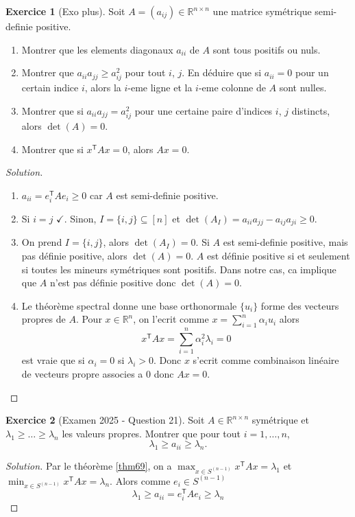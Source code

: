 \documentclass[a4paper,12pt,french]{report}
\theoremstyle{plain}
\theoremstyle{definition}
\newtheorem{exercise}{Exercice}[chapter]
\begin{document}
\begin{exercise}[Exo plus]
Soit $A=(a_{ij})\in \mathbb{R}^{n\times n}$ une matrice symétrique semi-definie positive.
\begin{enumerate}
\item Montrer que les elements diagonaux $a_{ii}$ de $A$ sont tous positifs ou nuls.
\item Montrer que $a_{ii}a_{jj}\ge a_{ij}^{2}$ pour tout $i$, $j$. En déduire que si $a_{ii}=0$ pour un certain indice $i$, alors la $i$-eme ligne et la $i$-eme colonne de $A$ sont nulles.
\item Montrer que si $a_{ii}a_{jj}=a_{ij}^{2}$ pour une certaine paire d'indices $i$, $j$ distincts, alors $\det(A)=0$.
\item Montrer que si $x^{\mathsf{T}}Ax=0$, alors $Ax=0$.
\end{enumerate}
\end{exercise}
\begin{proof}[Solution]
\begin{enumerate}
\item $a_{ii}=e_{i}^{\mathsf{T}}Ae_{i}\ge 0$ car $A$ est semi-definie positive.
\item Si $i=j$ $\checkmark$. Sinon, $I=\{ i,j \}\subseteq[n]$ et $\det(A_{I})=a_{ii}a_{jj}-a_{ij}a_{ji}\ge 0$.
\item On prend $I=\{ i,j \}$, alors $\det (A_{I})=0$. Si $A$ est semi-definie positive, mais pas définie positive, alors $\det(A)=0$. $A$ est définie positive si et seulement si toutes les mineurs symétriques sont positifs. Dans notre cas, ca implique que $A$ n'est pas définie positive donc $\det(A)=0$.
\item Le théorème spectral donne une base orthonormale $\{ u_{i} \}$ forme des vecteurs propres de $A$. Pour $x \in \mathbb{R}^{n}$, on l'ecrit comme $x=\sum_{i=1}^{n}\alpha _{i}u_{i}$ alors
$$
x^{\mathsf{T}}Ax=\sum_{i=1}^{n} \alpha _{i}^{2}\lambda _{i}=0
$$
est vraie que si $\alpha _{i}=0$ si $\lambda _{i}>0$. Donc $x$ s'ecrit comme combinaison linéaire de vecteurs propre associes a 0 donc $Ax=0$.
\end{enumerate}
\end{proof}
\begin{exercise}[Examen 2025 - Question 21]
Soit $A\in \mathbb{R}^{n\times n}$ symétrique et $\lambda_{1}\ge\dots\ge\lambda _{n}$ les valeurs propres. Montrer que pour tout $i=1,\dots,n$,
$$
\lambda_{1}\ge a_{ii}\ge \lambda _{n}.
$$
\end{exercise}
\begin{proof}[Solution]
Par le théorème \ref{thm69},  on a $\max_{x \in S^{(n-1)}}x^{\mathsf{T}}Ax=\lambda_{1}$ et $\min_{x \in S^{(n-1)}}x^{\mathsf{T}}Ax=\lambda _{n}$. Alors comme $e_{i}\in S^{(n-1)}$ 
$$
\lambda_{1}\ge a_{ii}=e_{i}^{\mathsf{T}}Ae_{i}\ge \lambda _{n}
$$
\end{proof}
\end{document}

